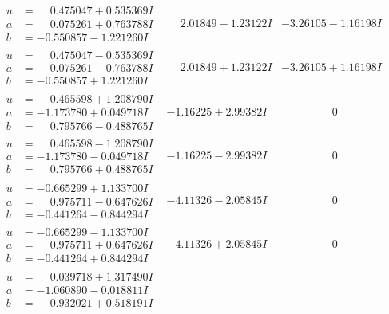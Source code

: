 \documentclass[1p]{elsarticle_modified}
\theoremstyle{definition}
\begin{document}
$$\begin{array}{c|c|c}
\begin{aligned}
u &= \phantom{-}0.475047 + 0.535369 I \\
a &= \phantom{-}0.075261 + 0.763788 I \\
b &= -0.550857 - 1.221260 I\end{aligned}
 & \phantom{-}2.01849 - 1.23122 I & -3.26105 - 1.16198 I \\ \hline\begin{aligned}
u &= \phantom{-}0.475047 - 0.535369 I \\
a &= \phantom{-}0.075261 - 0.763788 I \\
b &= -0.550857 + 1.221260 I\end{aligned}
 & \phantom{-}2.01849 + 1.23122 I & -3.26105 + 1.16198 I \\ \hline\begin{aligned}
u &= \phantom{-}0.465598 + 1.208790 I \\
a &= -1.173780 + 0.049718 I \\
b &= \phantom{-}0.795766 - 0.488765 I\end{aligned}
 & -1.16225 + 2.99382 I & \phantom{-0.000000 } 0 \\ \hline\begin{aligned}
u &= \phantom{-}0.465598 - 1.208790 I \\
a &= -1.173780 - 0.049718 I \\
b &= \phantom{-}0.795766 + 0.488765 I\end{aligned}
 & -1.16225 - 2.99382 I & \phantom{-0.000000 } 0 \\ \hline\begin{aligned}
u &= -0.665299 + 1.133700 I \\
a &= \phantom{-}0.975711 - 0.647626 I \\
b &= -0.441264 - 0.844294 I\end{aligned}
 & -4.11326 - 2.05845 I & \phantom{-0.000000 } 0 \\ \hline\begin{aligned}
u &= -0.665299 - 1.133700 I \\
a &= \phantom{-}0.975711 + 0.647626 I \\
b &= -0.441264 + 0.844294 I\end{aligned}
 & -4.11326 + 2.05845 I & \phantom{-0.000000 } 0 \\ \hline\begin{aligned}
u &= \phantom{-}0.039718 + 1.317490 I \\
a &= -1.060890 - 0.018811 I \\
b &= \phantom{-}0.932021 + 0.518191 I\end{aligned}

\end{array}$$
\end{document}
